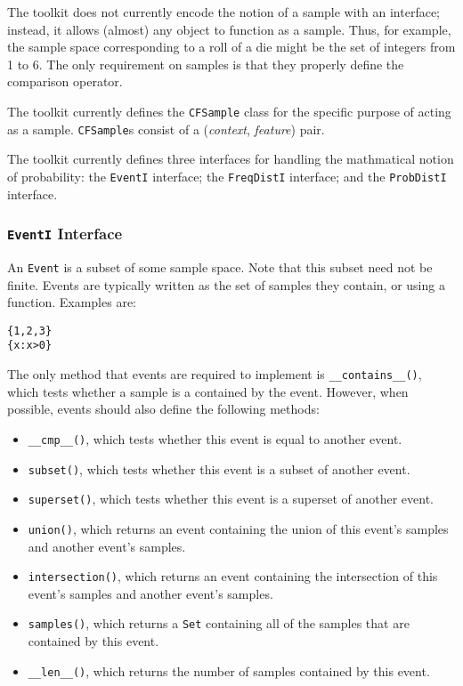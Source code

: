 \documentclass{article}
\begin{document}
The toolkit does not currently encode the notion of a sample with an
interface; instead, it allows (almost) any object to function as a
sample.  Thus, for example, the sample space corresponding to a roll
of a die might be the set of integers from 1 to 6.  The only
requirement on samples is that they properly define the comparison
operator. 

The toolkit currently defines the \texttt{CFSample} class for the
specific purpose of acting as a sample.  \texttt{CFSample}s consist of 
a (\emph{context}, \emph{feature}) pair.

The toolkit currently defines three interfaces for handling the
mathmatical notion of probability: the \texttt{EventI} interface; the
\texttt{FreqDistI} interface; and the \texttt{ProbDistI} interface.

\subsubsection{\texttt{EventI} Interface}

    An \texttt{Event} is a subset of some sample space.  Note that
    this subset need not be finite.  Events are typically written as
    the set of samples they contain, or using a function.  Examples
    are:

\begin{verbatim}
{1,2,3}
{x:x>0}
\end{verbatim}

    The only method that events are required to implement is
    \texttt{\_\_contains\_\_()}, which tests whether a sample is a
    contained by the event.  However, when possible, events should
    also define the following methods:
    \begin{itemize}
      \item \texttt{\_\_cmp\_\_()}, which tests whether this event is
           equal to another event.
      \item \texttt{subset()}, which tests whether this event is a
           subset of another event.
      \item \texttt{superset()}, which tests whether this event is
           a superset of another event.
      \item \texttt{union()}, which returns an event containing the
           union of this event's samples and another event's samples.
      \item \texttt{intersection()}, which returns an event
           containing the intersection of this event's samples and
           another event's samples.
      \item \texttt{samples()}, which returns a \texttt{Set}
           containing all of the samples that are contained by this
           event. 
      \item \texttt{\_\_len\_\_()}, which returns the number of samples 
           contained by this event.
    \end{itemize}
    
\end{document}
